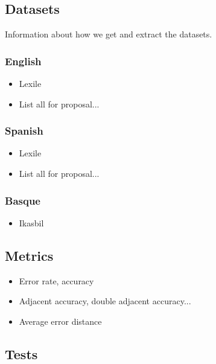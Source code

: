 \documentclass[12pt]{article}
\begin{document}
\subsection{Datasets}
Information about how we get and extract the datasets.
\subsubsection{English}
\begin{itemize}
\item Lexile
\item List all for proposal...
\end{itemize}
\subsubsection{Spanish}
\begin{itemize}
\item Lexile
\item List all for proposal...
\end{itemize}
\subsubsection{Basque}
\begin{itemize}
\item Ikasbil
\end{itemize}

\subsection{Metrics}

\begin{itemize}
\item Error rate, accuracy
\item Adjacent accuracy, double adjacent accuracy...
\item Average error distance
\end{itemize}

\subsection{Tests}
\end{document}
